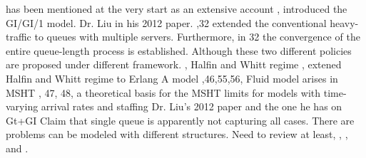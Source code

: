  has been mentioned at the very start as an extensive account\markdownRendererUlItemEnd 
{}, introduced the \markdownRendererDollarSign{}GI/GI/1\markdownRendererDollarSign{} model.\markdownRendererUlItemEnd 
\markdownRendererUlItem {}\markdownRendererUnderscore{} Dr. Liu in his 2012 paper. \markdownRendererUlItemEnd 
{},32 extended the conventional heavy-traffic to queues with multiple servers. Furthermore, in 32 the convergence of the entire queue-length process is established.\markdownRendererUlItemEnd 
\markdownRendererUlEndTight \markdownRendererInterblockSeparator
{}\markdownRendererInterblockSeparator
{} Although these two different policies are proposed under different framework.\markdownRendererInterblockSeparator
{}\markdownRendererUlBeginTight
{}, Halfin and Whitt regime\markdownRendererUlItemEnd 
{}, extened Halfin and Whitt regime to Erlang A model\markdownRendererUlItemEnd 
{}\markdownRendererUlItemEnd 
{},46,55,56, Fluid model arises in MSHT\markdownRendererUlItemEnd 
\markdownRendererUlEndTight \markdownRendererInterblockSeparator
{}\markdownRendererInterblockSeparator
{}\markdownRendererUlBeginTight
{}, 47, 48, a theoretical basis for the MSHT limits for models with time-varying arrival rates and staffing\markdownRendererUlItemEnd 
\markdownRendererUlItem Dr. Liu's 2012 paper and the one he has on \markdownRendererDollarSign{}Gt+GI\markdownRendererDollarSign{}\markdownRendererUlItemEnd 
\markdownRendererUlEndTight \markdownRendererInterblockSeparator
{}\markdownRendererInterblockSeparator
{}Claim that single queue is apparently not capturing all cases. There are problems can be modeled with different structures. Need to review at least, , , and .\markdownRendererInterblockSeparator
{}\markdownRendererUlBeginTight
